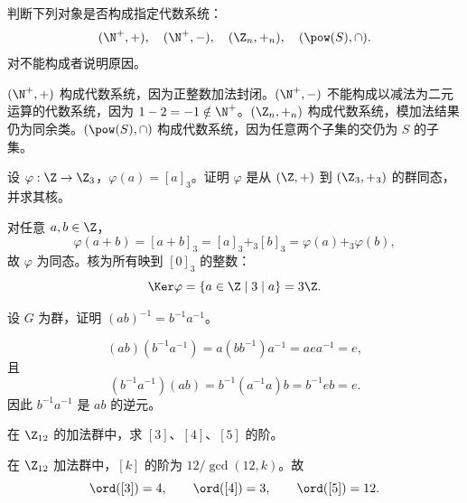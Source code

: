 %
%

\begin{exercise}[level=basic]
判断下列对象是否构成指定代数系统：
  \[
  (\N^+,+),\quad (\N^+,-),\quad (\Z_n,+_n),\quad (\pow(S),\cap).
  \]
  对不能构成者说明原因。
\begin{solution}
$(\N^+,+)$ 构成代数系统，因为正整数加法封闭。$(\N^+,-)$ 不能构成以减法为二元运算的代数系统，因为 $1-2=-1\notin\N^+$。$(\Z_n,+_n)$ 构成代数系统，模加法结果仍为同余类。$(\pow(S),\cap)$ 构成代数系统，因为任意两个子集的交仍为 $S$ 的子集。
\end{solution}
\end{exercise}

\begin{exercise}[level=basic]
设 $\varphi:\Z\to\Z_3$，$\varphi(a)=[a]_3$。证明 $\varphi$ 是从 $(\Z,+)$ 到 $(\Z_3,+_3)$ 的群同态，并求其核。
\begin{solution}
对任意 $a,b\in\Z$，
  \[
  \varphi(a+b)=[a+b]_3=[a]_3+_3[b]_3=\varphi(a)+_3\varphi(b),
  \]
  故 $\varphi$ 为同态。核为所有映到 $[0]_3$ 的整数：
  \[
  \Ker\varphi=\{a\in\Z\mid 3\mid a\}=3\Z.
  \]
\end{solution}
\end{exercise}

\begin{exercise}[level=basic]
设 $G$ 为群，证明 $(ab)^{-1}=b^{-1}a^{-1}$。
\begin{solution}
\[
  (ab)(b^{-1}a^{-1})=a(bb^{-1})a^{-1}=aea^{-1}=e,
  \]
  且
  \[
  (b^{-1}a^{-1})(ab)=b^{-1}(a^{-1}a)b=b^{-1}eb=e.
  \]
  因此 $b^{-1}a^{-1}$ 是 $ab$ 的逆元。
\end{solution}
\end{exercise}

\begin{exercise}[level=basic]
在 $\Z_{12}$ 的加法群中，求 $[3]$、$[4]$、$[5]$ 的阶。
\begin{solution}
在 $\Z_{12}$ 加法群中，$[k]$ 的阶为 $12/\gcd(12,k)$。故
  \[
  \ord([3])=4,\qquad \ord([4])=3,\qquad \ord([5])=12.
  \]
\end{solution}
\end{exercise}

